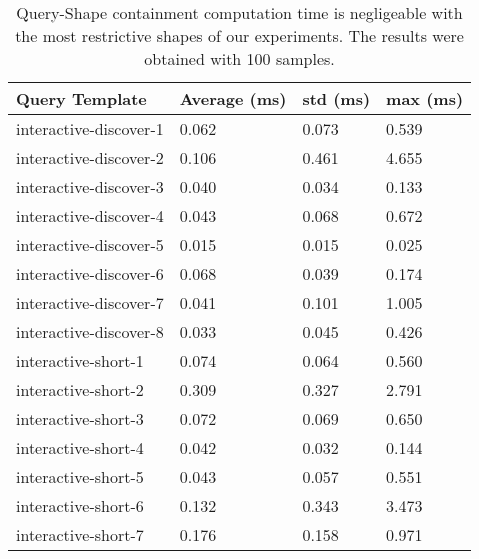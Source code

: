 \begin{table}
	\begin{center}
		\begin{tabular}{|l|l|l|l|}
			\hline
			Query Template & Average (ms) & std (ms) & max (ms) \\
			\hline
			interactive-discover-1 & 0.062 & 0.073 & 0.539 \\
			\hline
			interactive-discover-2 & 0.106 & 0.461 & 4.655 \\
			\hline
			interactive-discover-3 & 0.040 & 0.034 & 0.133 \\
			\hline
			interactive-discover-4 & 0.043 & 0.068 & 0.672 \\
			\hline
			interactive-discover-5 & 0.015 & 0.015 & 0.025 \\
			\hline
			interactive-discover-6 & 0.068 & 0.039 & 0.174 \\
			\hline
			interactive-discover-7 & 0.041 & 0.101 & 1.005 \\
			\hline
			interactive-discover-8 & 0.033 & 0.045 & 0.426 \\
			\hline
			interactive-short-1 & 0.074 & 0.064 & 0.560 \\
			\hline
			interactive-short-2 & 0.309 & 0.327 & 2.791 \\
			\hline
			interactive-short-3 & 0.072 & 0.069 & 0.650 \\
			\hline
			interactive-short-4 & 0.042 & 0.032 & 0.144 \\
			\hline
			interactive-short-5 & 0.043 & 0.057 & 0.551 \\
			\hline
			interactive-short-6 & 0.132 & 0.343 & 3.473 \\
			\hline
			interactive-short-7 & 0.176 & 0.158 & 0.971 \\
			\hline
		\end{tabular}
	\end{center}
	\caption{Query-Shape containment computation time is negligeable with the most restrictive shapes of our experiments. The results were obtained with 100 samples.}
	\label{tab:queryShapeContainmentEval}
\end{table}